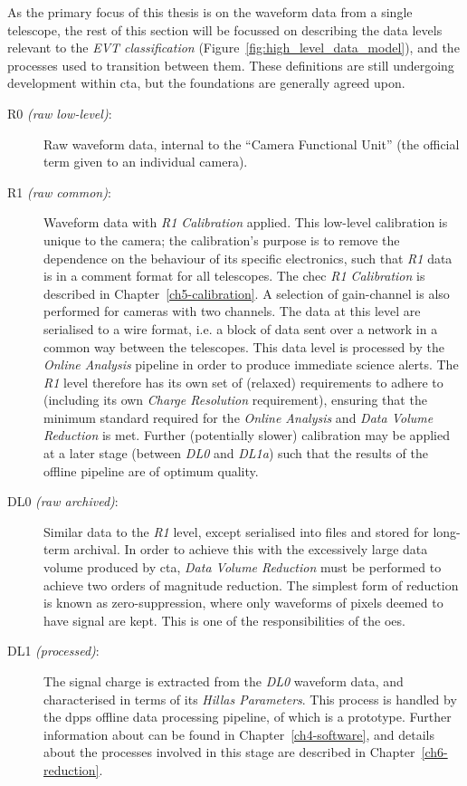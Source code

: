 As the primary focus of this thesis is on the waveform data from a single telescope, the rest of this section will be focussed on describing the data levels relevant to the \textit{EVT classification} (Figure~\ref{fig:high_level_data_model}), and the processes used to transition between them. These definitions are still undergoing development within \gls{cta}, but the foundations are generally agreed upon.
\begin{description}
\item[R0 \textit{(raw low-level)}:]
Raw waveform data, internal to the ``Camera Functional Unit'' (the official term given to an individual camera).
\item[R1 \textit{(raw common)}:]
Waveform data with \textit{R1 Calibration} applied. This low-level calibration is unique to the camera; the calibration's purpose is to remove the dependence on the behaviour of its specific electronics, such that \textit{R1} data is in a comment format for all telescopes. The \gls{chec} \textit{R1 Calibration} is described in Chapter~\ref{ch5-calibration}. A selection of gain-channel is also performed for cameras with two channels. The data at this level are serialised to a wire format, i.e. a block of data sent over a network in a common way between the telescopes. This data level is processed by the \textit{Online Analysis} pipeline in order to produce immediate science alerts. The \textit{R1} level therefore has its own set of (relaxed) requirements to adhere to (including its own \textit{Charge Resolution} requirement), ensuring that the minimum standard required for the \textit{Online Analysis} and \textit{Data Volume Reduction} is met. Further (potentially slower) calibration may be applied at a later stage (between \textit{DL0} and \textit{DL1a}) such that the results of the offline pipeline are of optimum quality. 
\item[DL0 \textit{(raw archived)}:]
Similar data to the \textit{R1} level, except serialised into files and stored for long-term archival. In order to achieve this with the excessively large data volume produced by \gls{cta}, \textit{Data Volume Reduction} must be performed to achieve two orders of magnitude reduction. The simplest form of reduction is known as zero-suppression, where only waveforms of pixels deemed to have signal are kept. This is one of the responsibilities of the \gls{oes}.
\item[DL1 \textit{(processed)}:]
The signal charge is extracted from the \textit{DL0} waveform data, and characterised in terms of its \textit{Hillas Parameters}. This process is handled by the \gls{dpps} offline data processing pipeline, of which  is a prototype. Further information about  can be found in Chapter~\ref{ch4-software}, and details about the processes involved in this stage are described in Chapter~\ref{ch6-reduction}.

\end{description}
